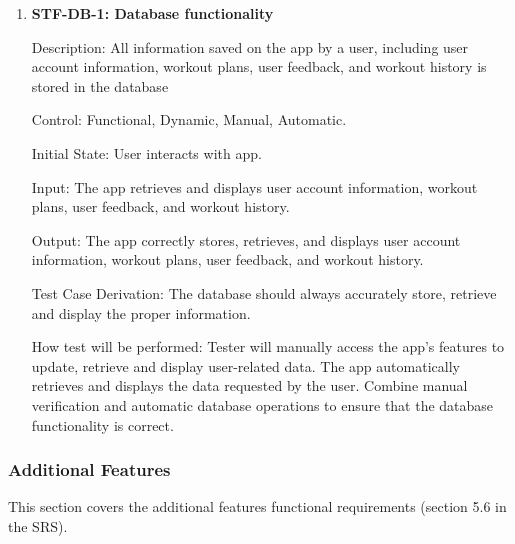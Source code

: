 \documentclass[12pt, titlepage]{article}
\begin{document}
    \begin{enumerate}

        \item{\textbf{STF-DB-1: Database functionality}\\}

        Description: All information saved on the app by a user, including user account information, workout plans, user feedback, and workout history is stored in the database

        Control: Functional, Dynamic, Manual, Automatic.

        Initial State: User interacts with app.

        Input: The app retrieves and displays user account information, workout plans, user feedback, and workout history.

        Output: The app correctly stores, retrieves, and displays user account information, workout plans, user feedback, and workout history.

        Test Case Derivation: The database should always accurately store, retrieve and display the proper information.

        How test will be performed: Tester will manually access the app’s features to update, retrieve and display user-related data. The app automatically retrieves and displays the data requested by the user. Combine manual verification and automatic database operations to ensure that the database functionality is correct.

    \end{enumerate}

    \subsubsection{Additional Features}
    This section covers the additional features functional requirements (section 5.6 in the SRS).
\end{document}
